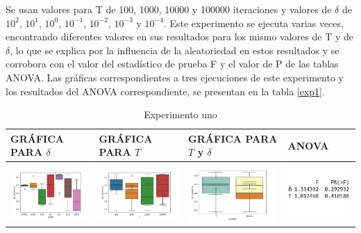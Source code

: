 Se usan valores para T de 100, 1000, 10000 y 100000 iteraciones y valores de $\delta$ de $10^{2}$, $10^{1}$, $10^{0}$, $10^{-1}$, $10^{-2}$, $10^{-3}$ y $10^{-4}$. Este experimento se ejecuta varias veces, encontrando diferentes valores en sus resultados para los mismo valores de T y de $\delta$, lo que se explica por la influencia de la aleatoriedad en estos resultados y se corrobora con el valor del estadístico de prueba F y el valor de P de las tablas ANOVA. Las gráficas correspondientes a tres ejecuciones de este experimento y los resultados del ANOVA correspondiente, se presentan en la tabla \ref{exp1}.
\begin{table}[H]
\caption{Experimento uno}
\centering
\begin{tabular}[c]{llll}
\multicolumn{1}{p{2.9cm}}{\textbf{GRÁFICA PARA $\delta$}} & \multicolumn{1}{p{2.9cm}}{\textbf{GRÁFICA PARA $T$}} & \multicolumn{1}{p{2.9cm}}{\textbf{GRÁFICA PARA $T$ y $\delta$}} & \multicolumn{1}{p{2.9cm}}{\textbf{ANOVA}}  \\ \hline
\multicolumn{1}{|l|}{\includegraphics[align=t, width=33mm]{cajasDeltha_exp11.jpg}}    & \multicolumn{1}{l|}{\includegraphics[align=t, width=33mm]{cajasT1_exp11.jpg} } & \multicolumn{1}{l|}{\includegraphics[align=t, width=33mm]{cajasT_Deltha_exp11.jpg} } &
\multicolumn{1}{p{3cm}|}{\includegraphics[align=t, width=30mm]{Anova11.png}}     \\ \hline

\end{tabular}
\end{table}
